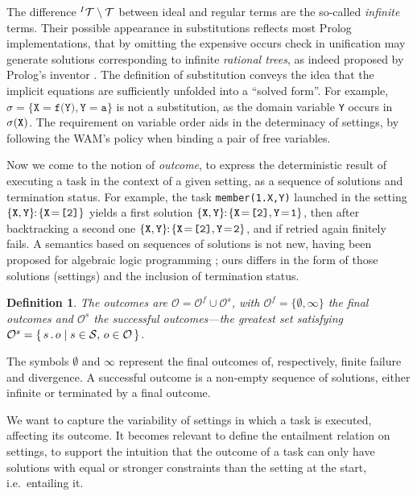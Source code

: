 \documentclass{tlp}
\def\set#1#2{\{\,#1\;|\;#2\,\}}
\def\S{{\cal S}}               \def\T{{\cal T}}               \def\V{{\cal V}}               \def\dlt{\triangle}
\newtheorem{definition}[theorem]{Definition}
\def\OO{\mathcal O}
\def\Stng{\S}
\def\Out{\OO}
\def\s{\sigma}
\def\soleq#1#2{\texttt{#1}\!=\!\texttt{#2}}
\def\stng#1#2{#1\!\!:\!#2}
\def\ff{\emptyset}
\def\soutsym{{\,.\,}}
\def\sout#1#2{#1\soutsym#2}
\begin{document}
\noindent The difference $^I\T\setminus\T$ between ideal and regular terms are
the so-called \emph{infinite} terms. Their possible appearance in substitutions
reflects most Prolog implementations, that by omitting the expensive occurs
check in unification may generate solutions corresponding to infinite
\emph{rational trees}, as indeed proposed by Prolog's inventor
\cite{co:82:pif}. The definition of substitution conveys the
idea that the implicit equations are sufficiently unfolded into a ``solved
form''. For example, $\s=\{\soleq X{f(Y)},\soleq Ya\}$ is not a substitution, as
the domain variable
{\tt Y} occurs in $\s({\tt X})$. The requirement on variable order aids in the
determinacy of settings, by following the WAM's policy when binding a pair of
free variables.

Now we come to the notion of \emph{outcome}, to express the deterministic result
of executing a task in the context of a given setting, as a sequence of solutions
and termination status. For example, the task \verb+member(1.X,Y)+ launched in
the setting $\stng{\{{\tt X},{\tt Y}\}}{\{\soleq X{[2]}\}}$ yields a first
solution $\stng{\{{\tt X},{\tt Y}\}}{\{\soleq X{[2]},\soleq{Y}{1}\}}$, then after
backtracking a second one $\stng{\{{\tt X},{\tt
    Y}\}}{\{\soleq{X}{[2]},\soleq{Y}{2}\}}$, and if retried again finitely
fails. A semantics based on sequences of solutions is not new, having been
proposed for algebraic logic programming \cite{se_sp_ho:99:alp}; ours differs in
the form of those solutions (settings) and the inclusion of termination
status.

\begin{definition}
  The \emph{outcomes} are $\Out=\Out^f\cup\Out^s$, with $\Out^f=\{\ff,\infty\}$
  the \emph{final} outcomes and $\Out^s$ the \emph{successful} outcomes---the greatest set satisfying $\Out^s=\set{\sout
    so}{s\in\Stng,\,o\in\Out}$.
\end{definition}

\noindent The symbols $\ff$ and $\infty$ represent the final outcomes of,
respectively, finite failure and divergence. A successful
outcome is a non-empty sequence of solutions, either
infinite or terminated by a final outcome.

We want to capture the variability of settings in which a task is executed,
affecting its outcome. It becomes relevant to define the entailment relation on
settings, to support the intuition that the outcome of a task
can only have solutions with equal or stronger constraints than the
setting at the start, i.e.\ entailing it.
\end{document}
